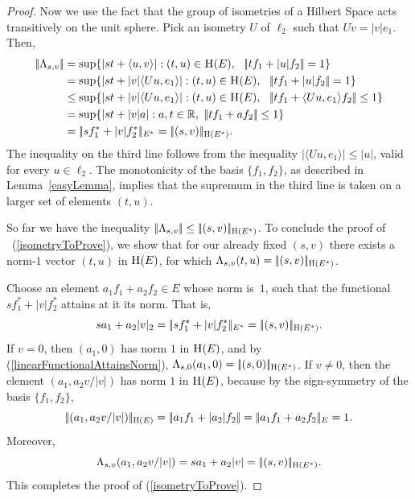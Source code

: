 \documentclass{article}[1100]
\theoremstyle{definition}
\theoremstyle{remark}
\newcommand\innerproduct[2]{\langle #1,#2\rangle}
\newcommand\ar{\mathbb{R}}
\newcommand\norma[1]{|\!|#1|\!|}
\newcommand\mySpaceH[1]{\textsc{H}(#1)}
\begin{document}
\begin{proof}
Now we use the fact that the group of isometries of a Hilbert Space acts transitively on the unit sphere.
Pick an isometry $U$ of $\ell_2$ such that $Uv=|v|e_1$. Then,
\[\begin{aligned}
\norma{\Lambda_{s,v}}&=\sup\{|st+\innerproduct{u}{v}|: (t,u)\in\mySpaceH{E},\ \ \norma{t f_1+|u|f_2}=1\}\\
&=\sup\{|st+|v|\innerproduct{Uu}{e_1}|:(t,u)\in\mySpaceH{E},\ \  \norma{t f_1+|u|f_2}=1\}\\
&\leq \sup\{|st+|v|\innerproduct{Uu}{e_1}|:(t,u)\in\mySpaceH{E},\ \  \norma{t f_1+\innerproduct{Uu}{e_1}f_2}\leq 1\}\\
&=\sup\{|st+|v|a|:a,t\in\ar,\  \norma{t f_1+a f_2}\leq 1\}\\
&=\norma{s f_1^*+|v|f_2^*}_{E^*} = \norma{(s,v)}_{\mySpaceH{E^*}}.
\end{aligned}
\]
The inequality on the third line follows from  the inequality $|\innerproduct{Uu}{e_1}|\leq|u|$, valid for every $u\in\ell_2$.  The monotonicity of the basis $\{f_1,f_2\}$, as described in Lemma~\ref{easyLemma}, implies that  the supremum in the third line is taken on a larger set of elements $(t,u)$.
\medskip

So far we have the inequality $\norma{\Lambda_{s,v}}\leq  \norma{(s,v)}_{\mySpaceH{E^*}}$. To conclude the proof of ~(\ref{isometryToProve}), we show that for our already fixed $(s,v)$ there exists a norm-$1$ vector $(t,u)$ in $\mySpaceH{E}$, for which 
$\Lambda_{s,v}(t,u)=\norma{(s,v)}_{\mySpaceH{E^*}}$.

\medskip

Choose an element $a_1f_1 + a_2f_2\in E$ whose norm is~$1$, such that the functional $sf_1^*+|v|f_2^*$ attains at it its norm. That is,
\begin{equation}\label{linearFunctionalAttainsNorm}
sa_1+a_2|v|_2=\norma{sf_1^*+|v|f_2^*}_{E^*}=\norma{(s,v)}_{\mySpaceH{E^*}}. 
\end{equation}
If $v=0$, then $(a_1,0)$ has norm $1$ in $\mySpaceH{E}$, and by (\ref{linearFunctionalAttainsNorm}), $\Lambda_{s,0}(a_1,0)=\norma{(s,0)}_{\mySpaceH{E^*}}$.
If $v\neq 0$, then the element $(a_1,a_2v/|v|)$ has norm $1$ in $\mySpaceH{E}$, because by the sign-symmetry of the basis $\{f_1,f_2\}$,
\[
\norma{(a_1,a_2v/|v|)}_{\mySpaceH{E}}=\norma{a_1f_1+|a_2|f_2}=\norma{a_1f_1+a_2f_2}_E =1.
\]
Moreover, 
\[\Lambda_{s,v}(a_1,a_2v/|v|)=sa_1+a_2|v|=\norma{(s,v)}_{\mySpaceH{E^*}}.\]
This completes the proof of  (\ref{isometryToProve}).  
\end{proof}
\end{document}
